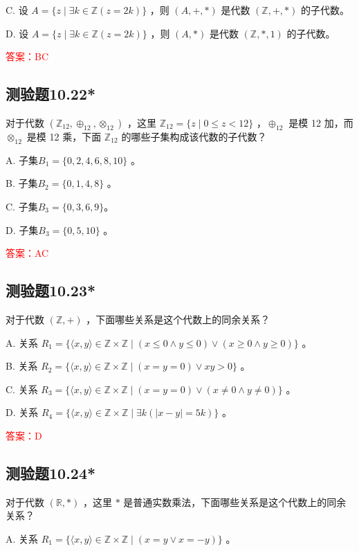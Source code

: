 \documentclass[UTF8, heading=true]{ctexart}
\begin{document}
C. 设 $A=\{z \mid \exists k \in \mathbb{Z}(z=2 k)\}$ ，则 $(A,+, *)$ 是代数 $(\mathbb{Z},+, *)$ 的子代数。

D. 设 $A=\{z \mid \exists k \in \mathbb{Z}(z=2 k)\}$ ，则 $(A, *)$ 是代数 $(\mathbb{Z}, *, 1)$ 的子代数。

\textcolor{red}{答案：BC}

\subsection{测验题10.22*}

对于代数 $\left(\mathbb{Z}_{12}, \oplus_{12}, \otimes_{12}\right)$ ，这里 $\mathbb{Z}_{12}=\{z \mid 0 \leq z<12\}$ ，$\oplus_{12}$ 是模 12 加，而 $\otimes_{12}$ 是模 12 乘，下面 $\mathbb{Z}_{12}$ 的哪些子集构成该代数的子代数？

A. 子集$B_1 = \{0,2,4,6,8,10\}$ 。

B. 子集$B_2 = \{0,1,4,8\}$ 。

C. 子集$B_3 = \{0,3,6,9\}$。

D. 子集$B_3 =\{0,5,10\}$ 。

\textcolor{red}{答案：AC}

\subsection{测验题10.23*}

对于代数 $(\mathbb{Z},+)$ ，下面哪些关系是这个代数上的同余关系？

A. 关系 $R_1=\{\langle x, y\rangle \in \mathbb{Z} \times \mathbb{Z} \mid(x \leq 0 \wedge y \leq 0) \vee(x \geq 0 \wedge y \geq 0)\}$ 。

B. 关系 $R_2=\{\langle x, y\rangle \in \mathbb{Z} \times \mathbb{Z} \mid(x=y=0) \vee x y>0\}$ 。

C. 关系 $R_3=\{\langle x, y\rangle \in \mathbb{Z} \times \mathbb{Z} \mid(x=y=0) \vee(x \neq 0 \wedge y \neq 0)\}$ 。

D. 关系 $R_4=\{\langle x, y\rangle \in \mathbb{Z} \times \mathbb{Z} \mid \exists k(|x-y|=5 k)\}$ 。


\textcolor{red}{答案：D}

\subsection{测验题10.24*}

对于代数 $(\mathbb{R}, *)$ ，这里 $*$ 是普通实数乘法，下面哪些关系是这个代数上的同余关系？

A. 关系 $R_1=\{\langle x, y\rangle \in \mathbb{Z} \times \mathbb{Z} \mid(x=y \vee x=-y)\}$ 。
\end{document}
